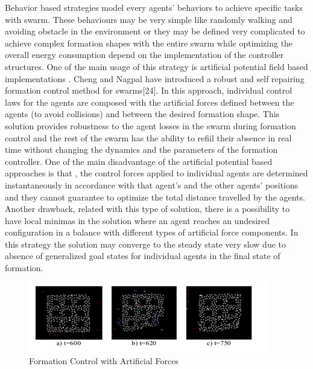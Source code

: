 Behavior based strategies model every agents' behaviors to achieve specific tasks with swarm. These behaviours may be very simple like randomly walking and avoiding obstacle in the environment or they may be defined very complicated to achieve complex formation shapes with the entire swarm while optimizing the overall energy consumption depend on the implementation of the controller structures.  One of the main usage of this strategy is artificial potential field based implementations . Cheng and Nagpal have introduced a robust and self repairing formation control method for swarms[24]. In this approach, individual control laws for the agents are composed with the artificial forces defined between the agents (to avoid collisions) and between the desired formation shape. This solution provides robustness to the agent losses in the swarm during formation control and the rest of the swarm has the ability to refiil their absence in real time without changing the dynamics and the parameters of the formation controller. One of the main disadvantage of the artificial potential based approaches is that , the control forces applied to individual agents are determined instantaneously in accordance with that agent's and the other agents' positions and they cannot guarantee to optimize the total distance travelled by the agents. Another drawback, related with this type of solution, there is a possibility to have local minimas in the solution where an agent reaches an undesired configuration in a balance with different types of artificial force components. In this strategy the solution may converge to the steady state very slow due to absence of generalized goal states for individual agents in the final state of formation. 

\begin{figure}[H]
	\caption{Formation Control with Artificial Forces}
	\centering
	\includegraphics[scale = 1]{potential}
\end{figure}


